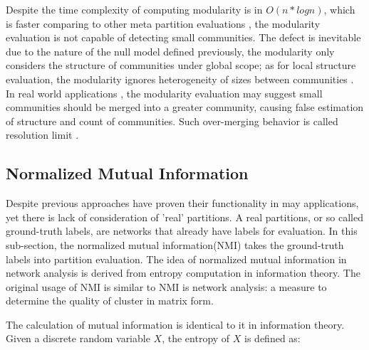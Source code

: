 \documentclass[12pt]{article}
\begin{document}
Despite the time complexity of computing modularity is in $O(n*log n)$, which is faster comparing to other meta partition evaluations \cite{2, 12}, the modularity evaluation is not capable of detecting small communities. The defect is inevitable due to the nature of the null model defined previously, the modularity only considers the structure of communities under global scope; as for local structure evaluation, the modularity ignores heterogeneity of sizes between communities \cite{13}. In real world applications \cite{9, 10}, the modularity evaluation may suggest small communities should be merged into a greater community, causing false estimation of structure and count of communities. Such over-merging behavior is called resolution limit \cite{13}.


\subsection{Normalized Mutual Information}


Despite previous approaches have proven their functionality in may applications, yet there is lack of consideration of 'real' partitions. A real partitions, or so called ground-truth labels, are networks that already have labels for evaluation. In this sub-section, the normalized mutual information(NMI) takes the ground-truth labels into partition evaluation. The idea of normalized mutual information in network analysis is derived from entropy computation in information theory. The original usage of NMI is similar to NMI is network analysis: a measure to determine the quality of cluster in matrix form\cite{23}. 

The calculation of mutual information is identical to it in information theory. Given a discrete random variable $X$, the entropy of $X$ is defined as:
\end{document}
